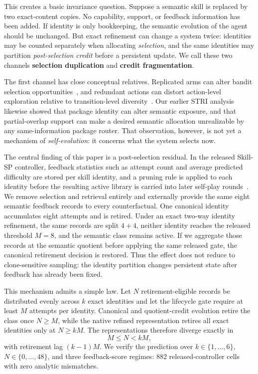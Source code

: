 This creates a basic invariance question. Suppose a semantic skill is replaced by two exact-content copies. No capability, support, or feedback information has been added. If identity is only bookkeeping, the semantic evolution of the agent should be unchanged. But exact refinement can change a system twice: identities may be counted separately when allocating \emph{selection}, and the same identities may partition \emph{post-selection credit} before a persistent update. We call these two channels \textbf{selection duplication} and \textbf{credit fragmentation}.

The first channel has close conceptual relatives. Replicated arms can alter bandit selection opportunities~\citep{shin2022replication}, and redundant actions can distort action-level exploration relative to transition-level diversity~\citep{baram2021redundancy}. Our earlier STRI analysis likewise showed that package identity can alter semantic exposure, and that partial-overlap support can make a desired semantic allocation unrealizable by any same-information package router. That observation, however, is not yet a mechanism of \emph{self-evolution}: it concerns what the system selects now.

The central finding of this paper is a post-selection residual. In the released Skill-SP controller, feedback statistics such as attempt count and average predicted difficulty are stored per skill identity, and a pruning rule is applied to each identity before the resulting active library is carried into later self-play rounds~\citep{huang2026skill}. We remove selection and retrieval entirely and externally provide the same eight semantic feedback records to every counterfactual. One canonical identity accumulates eight attempts and is retired. Under an exact two-way identity refinement, the same records are split $4+4$, neither identity reaches the released threshold $M=8$, and the semantic class remains active. If we aggregate those records at the semantic quotient before applying the same released gate, the canonical retirement decision is restored. Thus the effect does not reduce to clone-sensitive sampling: the identity partition changes persistent state after feedback has already been fixed.

This mechanism admits a simple law. Let $N$ retirement-eligible records be distributed evenly across $k$ exact identities and let the lifecycle gate require at least $M$ attempts per identity. Canonical and quotient-credit evolution retire the class once $N\ge M$, while the native refined representation retires all exact identities only at $N\ge kM$. The representations therefore diverge exactly in
\[
M\le N<kM,
\]
with retirement lag $(k-1)M$. We verify the prediction over $k\in\{1,\ldots,6\}$, $N\in\{0,\ldots,48\}$, and three feedback-score regimes: 882 released-controller cells with zero analytic mismatches.

